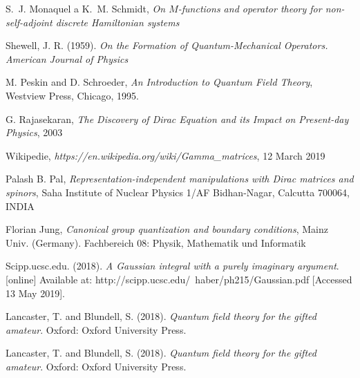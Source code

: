 \begin{thebibliography}{10}

    S.~J. Monaquel a K.~M. Schmidt, \textit{On $M$-functions and operator
      theory for non-self-adjoint discrete Hamiltonian systems}

        Shewell, J. R. (1959). \textit{On the Formation of Quantum-Mechanical 
        Operators. American Journal of Physics}

        M. Peskin and D. Schroeder, \textit{An Introduction to Quantum Field Theory},
        Westview Press, Chicago, 1995.

        G. Rajasekaran, \textit{The Discovery of Dirac Equation and its Impact on Present-day Physics},
        2003

        Wikipedie, \textit{https://en.wikipedia.org/wiki/Gamma\_matrices},
        12 March 2019

        Palash B. Pal, \textit{Representation-independent manipulations with Dirac matrices and spinors},
        Saha Institute of Nuclear Physics 1/AF Bidhan-Nagar, Calcutta 700064, INDIA

        Florian Jung, \textit{Canonical group quantization and boundary conditions},
        Mainz Univ. (Germany). Fachbereich 08: Physik, Mathematik und Informatik

        Scipp.ucsc.edu. (2018). \textit{A Gaussian integral with a purely imaginary argument}. 
        [online] Available at: http://scipp.ucsc.edu/~haber/ph215/Gaussian.pdf [Accessed 13 May 2019].

        Lancaster, T. and Blundell, S. (2018). \textit{Quantum field theory for the gifted amateur}. 
        Oxford: Oxford University Press.

        Lancaster, T. and Blundell, S. (2018). \textit{Quantum field theory for the gifted amateur}. 
        Oxford: Oxford University Press.
\end{thebibliography}

\cleardoublepage
